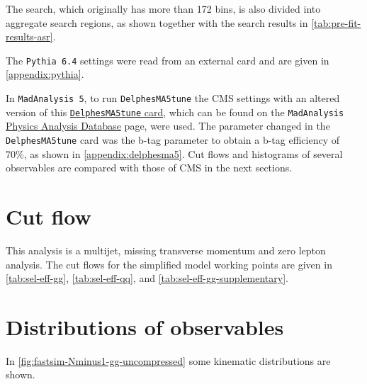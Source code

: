 \documentclass[12pt,A4paper]{article}
\begin{document}
The search, which originally has more than 172 bins, is also divided into aggregate search regions, as shown together with the search results in \autoref{tab:pre-fit-results-asr}.


The \texttt{Pythia 6.4} settings were read from an external card and are given in \autoref{appendix:pythia}.


In \texttt{MadAnalysis 5}, to run \texttt{DelphesMA5tune} the CMS settings 
with an altered version of this \href{http://madanalysis.irmp.ucl.ac.be/attachment/wiki/PhysicsAnalysisDatabase/delphesMA5tune_card_CMS_SUSY.tcl}{\texttt{DelphesMA5tune} card}, which can be found on the \texttt{MadAnalysis} \href{http://madanalysis.irmp.ucl.ac.be/attachment/wiki/PhysicsAnalysisDatabase/}{Physics Analysis Database} page, were used.
The parameter changed in the \texttt{DelphesMA5tune} card was the b-tag parameter to obtain a b-tag efficiency of 70\%, as shown in \autoref{appendix:delphesma5}.
Cut flows and histograms of several observables are compared with those of CMS in the next sections.


\clearpage

\section{Cut flow}
This analysis is a multijet, missing transverse momentum and zero lepton analysis. The cut flows for the simplified model working points are given in \autoref{tab:sel-eff-gg}, \autoref{tab:sel-eff-qq}, and \autoref{tab:sel-eff-gg-supplementary}.

    \clearpage

\section{Distributions of observables}
In \autoref{fig:fastsim-Nminus1-gg-uncompressed} some kinematic distributions are shown.



\clearpage
\end{document}
